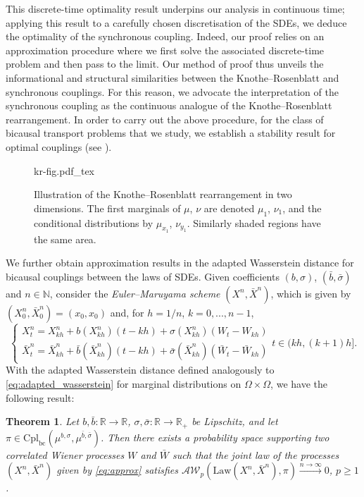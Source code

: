 \documentclass[oneside]{amsart}
\newtheorem{theorem}{Theorem}[section]
\theoremstyle{definition}
\newcommand{\AW}{\mathcal A\mathcal W}
\newcommand{\Law}{\mathrm{Law}}
\newcommand{\N}{\mathbb N}
\newcommand{\R}{\mathbb R}
\newcommand{\cplbc}{\mathrm{Cpl}_{\mathrm{bc}}}
\def\R{{\mathbb R}}
\newcommand{\incfig}[1]{%
    \def\svgwidth{0.75\textwidth}
    {kr-fig.pdf_tex}
}
\numberwithin{equation}{section}
\begin{document}
	This discrete-time optimality result underpins our analysis in continuous time; applying this result to a carefully chosen discretisation of the SDEs, we deduce the optimality of the synchronous coupling. 
	Indeed, our proof relies on an approximation procedure where we first solve the associated discrete-time problem and then pass to the limit. 
	Our method of proof thus unveils the informational and structural similarities between the Knothe--Rosenblatt and synchronous couplings. For this reason, we advocate the interpretation of the synchronous coupling as the continuous analogue of the Knothe--Rosenblatt rearrangement.
	In order to carry out the above procedure, for the class of bicausal transport problems that we study, we establish a stability result for optimal couplings (see ).
	
	
	
	\begin{figure}[h]
	    \centering
    	\incfig{fig-kr}
	    \caption{Illustration of the Knothe--Rosenblatt rearrangement in two dimensions. The first marginals of $\mu$, $\nu$ are denoted $\mu_1$, $\nu_1$, and the conditional distributions by $\mu_{x_1}$, $\nu_{y_1}$. Similarly shaded regions have the same area.}
    	\label{fig:kr}
	\end{figure}
	
	We further obtain approximation results in the adapted Wasserstein distance for bicausal couplings between the laws of SDEs. Given coefficients $(b,\sigma)$, $(\bar b,\bar\sigma)$ and $n \in \N$, consider the \emph{Euler--Maruyama scheme} $(X^n,\bar X^n)$, which is given by $(X^n_0, \bar X^n_0) = (x_0, x_0)$ and, for $h=1/n$, $k=0,...,n-1$,
\begin{equation}\label{eq:approx}
\begin{cases}
    X^n_t = X^n_{kh}+b(X^n_{kh})\!\left(t-kh\right)+\sigma(X^n_{kh})\!\left(W_t-W_{kh}\right)\\
	\bar X^n_t = \bar X^n_{kh}+\bar b(\bar X^n_{kh})\!\left(t-kh\right)+\bar\sigma(\bar X^n_{kh})\!\left(\bar W_t-\bar W_{kh}\right)
\end{cases}
t\in(kh,(k+1)h].
\end{equation}
With the adapted Wasserstein distance defined analogously to \eqref{eq:adapted_wasserstein} for marginal distributions on $\Omega\times\Omega$, we have the following result: 
\begin{theorem}\label{thm:convergence}
	Let $b,\bar b\colon \R \to \R$, $\sigma,\bar\sigma \colon \R\to\R_+$ be Lipschitz, and let $\pi\in\cplbc(\mu^{b,\sigma},\mu^{\bar b,\bar\sigma})$. Then there exists a probability space supporting two correlated Wiener processes $W$ and $\bar W$ such that the joint law of the processes $(X^n,\bar X^n)$ given by \eqref{eq:approx} satisfies $\AW_p(\Law(X^n,\bar X^n),\pi)\xrightarrow{n \to \infty} 0$, $p\ge 1$. 
\end{theorem}
\end{document}
